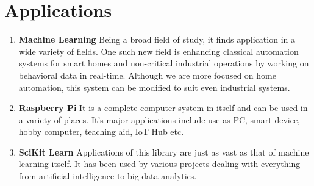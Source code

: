 \section{Applications}

\begin{enumerate}
\item \textbf{Machine Learning}
Being a broad field of study, it finds application in a wide variety of fields. One such new field is enhancing classical automation systems for smart homes and non-critical industrial operations by working on behavioral data in real-time. Although we are more focused on home automation, this system can be modified to suit even industrial systems.

\item \textbf{Raspberry Pi}
It is a complete computer system in itself and can be used in a variety of places. It's major applications include use as PC, smart device, hobby computer, teaching aid, IoT Hub etc.

\item \textbf{SciKit Learn}
Applications of this library are just as vast as that of machine learning itself. It has been used by various projects dealing with everything from artificial intelligence to big data analytics.
\end{enumerate}

